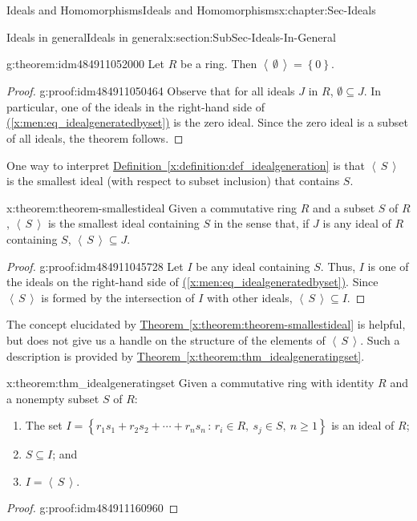 \documentclass[oneside,10pt,]{book}
\newcommand{\xreffont}{\relax}
\numberwithin{equation}{section}
\renewcommand{\ge}{\geqslant}
\newcommand{\ideal}[1]{\left\langle\, #1 \,\right\rangle}
\newcommand{\set}[1]{\left\{ {#1} \right\}}
\newcommand{\setof}[2]{{\left\{#1\,\colon\,#2\right\}}}
\begin{document}
\begin{chapterptx}{Ideals and Homomorphisms}{}{Ideals and Homomorphisms}{}{}{x:chapter:Sec-Ideals}
\begin{sectionptx}{Ideals in general}{}{Ideals in general}{}{}{x:section:SubSec-Ideals-In-General}
\begin{theorem}{}{}{g:theorem:idm484911052000}
Let \(R\) be a ring. Then \(\ideal{\emptyset} = \set{0}\).\end{theorem}
\begin{proof}{}{g:proof:idm484911050464}
Observe that for all ideals \(J\) in \(R\), \(\emptyset\subseteq J\). In particular, one of the ideals in the right-hand side of \hyperref[x:men:eq_idealgeneratedbyset]{({\xreffont\ref{x:men:eq_idealgeneratedbyset}})} is the zero ideal. Since the zero ideal is a subset of all ideals, the theorem follows.%
\end{proof}
One way to interpret \hyperref[x:definition:def_idealgeneration]{Definition~{\xreffont\ref{x:definition:def_idealgeneration}}} is that \(\ideal{S}\) is the smallest ideal (with respect to subset inclusion) that contains \(S\).%
\begin{theorem}{}{}{x:theorem:theorem-smallestideal}%
Given a commutative ring \(R\) and a subset \(S\) of \(R\), \(\ideal{S}\) is the smallest ideal containing \(S\) in the sense that, if \(J\) is any ideal of \(R\) containing \(S\), \(\ideal{S}\subseteq J\).%
\end{theorem}
\begin{proof}{}{g:proof:idm484911045728}
Let \(I\) be any ideal containing \(S\). Thus, \(I\) is one of the ideals on the right-hand side of \hyperref[x:men:eq_idealgeneratedbyset]{({\xreffont\ref{x:men:eq_idealgeneratedbyset}})}. Since \(\ideal{S}\) is formed by the intersection of \(I\) with other ideals, \(\ideal{S}\subseteq I\).%
\end{proof}
The concept elucidated by \hyperref[x:theorem:theorem-smallestideal]{Theorem~{\xreffont\ref{x:theorem:theorem-smallestideal}}} is helpful, but does not give us a handle on the structure of the elements of \(\ideal{S}\). Such a description is provided by \hyperref[x:theorem:thm_idealgeneratingset]{Theorem~{\xreffont\ref{x:theorem:thm_idealgeneratingset}}}.%
\begin{theorem}{}{}{x:theorem:thm_idealgeneratingset}%
Given a commutative ring with identity \(R\) and a nonempty subset \(S\) of \(R\):%
\begin{enumerate}
\item{}The set \(I = \setof{r_1 s_1 + r_2 s_2 + \cdots + r_n s_n}{r_i\in R, \ s_j \in S,\ n\ge 1}\) is an ideal of \(R\);%
\item{}\(S\subseteq I\); and%
\item{}\(I = \ideal{S}\).%
\end{enumerate}
%
\end{theorem}
\begin{proof}{}{g:proof:idm484911160960}

\end{proof}
\end{sectionptx}
\end{chapterptx}
\end{document}
